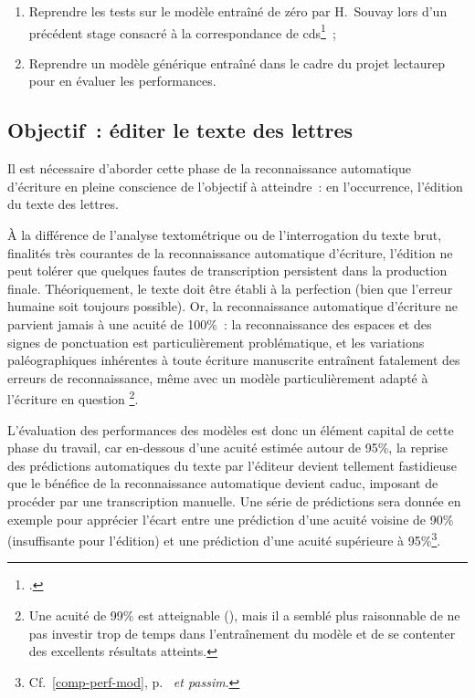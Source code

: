 \documentclass[a4paper,12pt,twoside]{book}
\begin{document}
				\begin{enumerate}
					\item Reprendre les tests sur le modèle entraîné de zéro par H.~Souvay lors d'un précédent stage consacré à la correspondance de \gls{cds}\footcite{souvayCorrespondanceConstanceSalm2021}~;
					\item Reprendre un modèle générique entraîné dans le cadre du projet \gls{lectaurep} pour en évaluer les performances.
				\end{enumerate}
		
			\subsection{Objectif~: éditer le texte des lettres}
				Il est nécessaire d'aborder cette phase de la reconnaissance automatique d'écriture en pleine conscience de l'objectif à atteindre~: en l'occurrence, l'édition du texte des lettres.
				
				À la différence de l'analyse textométrique ou de l'interrogation du texte brut, finalités très courantes de la reconnaissance automatique d'écriture, l'édition ne peut tolérer que quelques fautes de transcription persistent dans la production finale. Théoriquement, le texte doit être établi à la perfection (bien que l'erreur humaine soit toujours possible). Or, la reconnaissance automatique d'écriture ne parvient jamais à une acuité de 100\%~: la reconnaissance des espaces et des signes de ponctuation est particulièrement problématique, et les variations paléographiques inhérentes à toute écriture manuscrite entraînent fatalement des erreurs de reconnaissance, même avec un modèle particulièrement adapté à l'écriture en question
				\footnote{Une acuité de 99\% est atteignable (\cite{stokesEScriptoriumVREManuscript2021}), mais il a semblé plus raisonnable de ne pas investir trop de temps dans l'entraînement du modèle et de se contenter des excellents résultats atteints.}.
				
				L'évaluation des performances des modèles est donc un élément capital de cette phase du travail, car en-dessous d'une acuité estimée autour de 95\%, la reprise des prédictions automatiques du texte par l'éditeur devient tellement fastidieuse que le bénéfice de la reconnaissance automatique devient caduc, imposant de procéder par une transcription manuelle. Une série de prédictions sera donnée en exemple pour apprécier l'écart entre une prédiction d'une acuité voisine de 90\% (insuffisante pour l'édition) et une prédiction d'une acuité supérieure à 95\%\footnote{Cf.~\ref{comp-perf-mod}, p.~\pageref{comp-perf-mod} \textit{et passim}.}.
				
\end{document}
